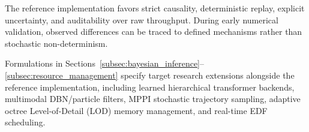 The reference implementation favors strict causality, deterministic replay, explicit uncertainty, and auditability over raw throughput. During early numerical validation, observed differences can be traced to defined mechanisms rather than stochastic non-determinism.

Formulations in Sections~\ref{subsec:bayesian_inference}--\ref{subsec:resource_management} specify target research extensions alongside the reference implementation, including learned hierarchical transformer backends, multimodal DBN/particle filters, MPPI stochastic trajectory sampling, adaptive octree Level-of-Detail (LOD) memory management, and real-time EDF scheduling.
